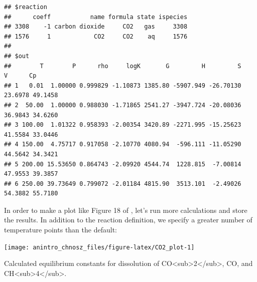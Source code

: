 \documentclass[]{tufte-handout}
\begin{document}
\begin{verbatim}
## $reaction
##      coeff           name formula state ispecies
## 3308    -1 carbon dioxide     CO2   gas     3308
## 1576     1            CO2     CO2    aq     1576
## 
## $out
##        T        P      rho     logK       G         H         S       V      Cp
## 1   0.01  1.00000 0.999829 -1.10873 1385.80 -5907.949 -26.70130 23.6978 49.1458
## 2  50.00  1.00000 0.988030 -1.71865 2541.27 -3947.724 -20.08036 36.9843 34.6260
## 3 100.00  1.01322 0.958393 -2.00354 3420.89 -2271.995 -15.25623 41.5584 33.0446
## 4 150.00  4.75717 0.917058 -2.10770 4080.94  -596.111 -11.05290 44.5642 34.3421
## 5 200.00 15.53650 0.864743 -2.09920 4544.74  1228.815  -7.00814 47.9553 39.3857
## 6 250.00 39.73649 0.799072 -2.01184 4815.90  3513.101  -2.49026 54.3882 55.7180
\end{verbatim}

In order to make a plot like Figure 18 of \citet{MSS13}, let's run more
calculations and store the results. In addition to the reaction
definition, we specify a greater number of temperature points than the
default:

\begin{marginfigure}
\texttt{[image: anintro\_chnosz\_files/figure-latex/CO2\_plot-1]} \caption[Calculated equilibrium constants for dissolution of CO<sub>2</sub>, CO, and CH<sub>4</sub>]{Calculated equilibrium constants for dissolution of CO<sub>2</sub>, CO, and CH<sub>4</sub>.}\label{fig:CO2_plot}
\end{marginfigure}
\end{document}
